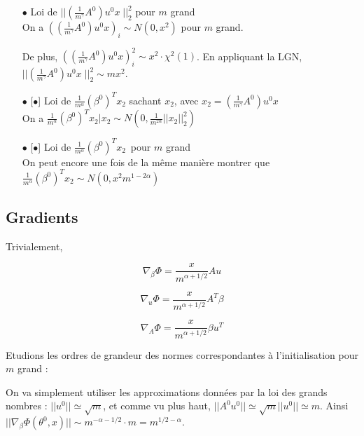 \documentclass[a4paper, 11pt, french]{article}
\theoremstyle{definition}
\begin{document}
\begin{itemize}
		\item[$\bullet$] Loi de $ || \left(\frac{1}{m^{\gamma}} A^0 \right) u^0 x \; ||_2^2 $ pour $m$ grand
		 \\
		 
		 On a $ \left( \left(\frac{1}{m^{\gamma}} A^0 \right) u^0 x \right)_i \sim  N(0,x^2)$ pour $m$ grand.
		
		De plus, $ \left( \left(\frac{1}{m^{\gamma}} A^0 \right) u^0 x \right)_i^2 \sim  
		x^2 \cdot  \chi^2 (1) $. En appliquant la LGN, $||\left(\frac{1}{m^{\gamma}} A^0 \right) u^0 x \; ||_2^2 \sim m x^2$. \\

		\item[$\bullet$][$\bullet$] Loi de $ \frac{1}{m^{\alpha}} (\beta^0)^T x_2 $ sachant $x_2$, avec 
		$x_2 = \left(\frac{1}{m^{\gamma}} A^0 \right) u^0 x$ \\
		
		On a 
		$ \frac{1}{m^{\alpha}} (\beta^0)^T x_2 | x_2 \sim N(0,  \frac{1}{m^{2\alpha}}||x_2||_2^2) $
		\\
		
		\item[$\bullet$][$\bullet$] Loi de $ \frac{1}{m^{\alpha}} (\beta^0)^T x_2 $ pour $m$ grand\\
		
		On peut encore une fois de la même manière montrer que 
		$ \frac{1}{m^{\alpha}} (\beta^0)^T x_2 \sim N(0,  x^2 m^{1 - 2\alpha}) $
		\\
		
	\end{itemize}

	\subsection{Gradients}
	
	Trivialement,
	
	\[\nabla_{\beta} \Phi = \frac{x}{m^{\alpha + 1/2}} A u\]
	
	\[\nabla_u \Phi = \frac{x}{m^{\alpha + 1/2}} A^T \beta\]

	\[\nabla_A \Phi = \frac{x}{m^{\alpha + 1/2}} \beta u^T\]
	
	Etudions les ordres de grandeur des normes correspondantes à l'initialisation pour $m$ grand :
	
	On va simplement utiliser les approximations données par la loi des grands nombres :
	 $||u^0|| \simeq \sqrt{m}$, et comme vu plus haut, 
	 $||A^0 u^0|| \simeq \sqrt{m}||u^0|| \simeq m$. Ainsi $||\nabla_{\beta} \Phi (\theta^0, x)|| \sim m^{-\alpha - 1/2} \cdot m = m^{1/2 - \alpha}$.
	 
\end{document}
